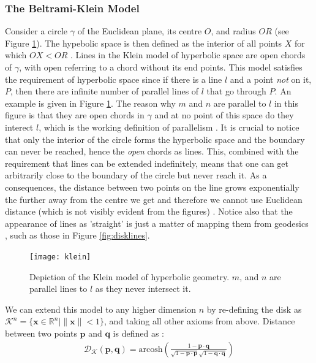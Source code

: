 \documentclass[12pt]{report}
\begin{document}
\subsubsection{The Beltrami-Klein Model}
Consider a circle $\gamma$ of the Euclidean plane, its centre $O$, and radius $OR$ (see Figure \ref{fig:klein}). The hypebolic space is then defined as the interior of all points $X$ for which $OX < OR$ \cite{Greenberg1994}. Lines in the Klein model of hyperbolic space are open chords of $\gamma$, with open referring to a chord without its end points. This model satisfies the requirement of hyperbolic space since if there is a line $l$ and a point \textit{not} on it, $P$, then there are infinite number of parallel lines of $l$ that go through $P$. An example is given in Figure \ref{fig:klein}. The reason why $m$ and $n$ are parallel to $l$ in this figure is that they are open chords in $\gamma$ and at no point of this space do they interect $l$, which is the working definition of parallelism \cite{Greenberg1994}. It is crucial to notice that only the interior of the circle forms the hyperbolic space and the boundary can never be reached, hence the \textit{open} chords as lines. This, combined with the requirement that lines can be extended indefinitely, means that one can get arbitrarily close to the boundary of the circle but never reach it. As a consequences, the distance between two points on the line grows exponentially the further away from the centre we get and therefore we cannot use Euclidean distance (which is not visibly evident from the figures) \cite{Greenberg1994}. Notice also that the appearance of lines as 'straight' is just a matter of mapping them from geodesics \cite{Greenberg1994}, such as those in Figure \ref{fig:disklines}. 

\begin{figure}
  \centering
	\texttt{[image: klein]}
	\caption{Depiction of the Klein model of hyperbolic geometry. $m$, and $n$ are parallel lines to $l$ as they never intersect it.}
	\label{fig:klein}
\end{figure}

We can extend this model to any higher dimension $n$ by re-defining the disk as $\mathcal{K}^n = \{\mathbf{x} \in \mathbb{R}^n | \lVert \mathbf{x} \rVert <1 \}$, and taking all other axioms from above. Distance between two points $\mathbf{p}$ and $\mathbf{q}$ is defined as \cite{Iversen1992}:
\begin{align}
  \mathcal{D_K}(\mathbf{p}, \mathbf{q}) = \text{arcosh} \left( \frac{1 - \mathbf{p} \cdot \mathbf{q}}{\sqrt{1-\mathbf{p}\cdot \mathbf{p}}\sqrt{1-\mathbf{q}\cdot \mathbf{q}}}   \right) 
  \label{eq:kdist}
\end{align}
\end{document}
